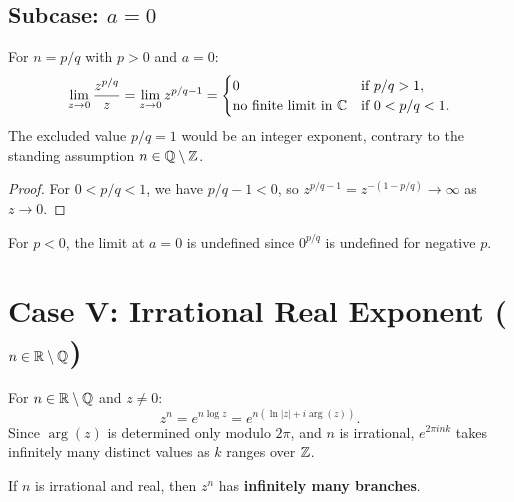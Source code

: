 \subsection{Subcase: $a = 0$}

\begin{proposition}
For $n = p/q$ with $p > 0$ and $a = 0$:
\begin{equation}
\lim_{z \to 0} \frac{z^{p/q}}{z} = \lim_{z \to 0} z^{p/q - 1} = 
\begin{cases}
0 & \text{if } p/q > 1, \\
\text{no finite limit in } \mathbb{C} & \text{if } 0 < p/q < 1.
\end{cases}
\end{equation}
The excluded value $p/q = 1$ would be an integer exponent, contrary to the
standing assumption $n \in \mathbb{Q} \setminus \mathbb{Z}$.
\end{proposition}

\begin{proof}
For $0 < p/q < 1$, we have $p/q - 1 < 0$, so $z^{p/q - 1} = z^{-(1 - p/q)} \to \infty$ as $z \to 0$.
\end{proof}

\begin{warning}
For $p < 0$, the limit at $a = 0$ is undefined since $0^{p/q}$ is undefined for negative $p$.
\end{warning}

\section{Case V: Irrational Real Exponent ($n \in \mathbb{R} \setminus \mathbb{Q}$)}

\begin{definition}
For $n \in \mathbb{R} \setminus \mathbb{Q}$ and $z \neq 0$:
\begin{equation}
z^n = e^{n \log z} = e^{n(\ln|z| + i\arg(z))}.
\end{equation}
Since $\arg(z)$ is determined only modulo $2\pi$, and $n$ is irrational, $e^{2\pi i n k}$ takes infinitely many distinct values as $k$ ranges over $\mathbb{Z}$.
\end{definition}

\begin{proposition}
If $n$ is irrational and real, then $z^n$ has \textbf{infinitely many branches}.
\end{proposition}

